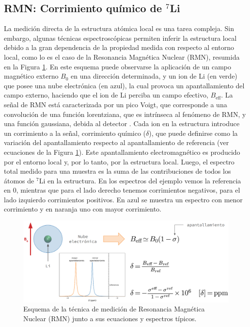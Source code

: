 \subsection{RMN: Corrimiento químico de $^7$Li}

La medición directa de la estructura atómica local es una tarea compleja. Sin
embargo, algunas técnicas espectroscópicas permiten inferir la estructura local 
debido a la gran dependencia de la propiedad medida con respecto al entorno local, 
como lo es el caso de la Resonancia Magnética Nuclear (RMN), resumida en la Figura \ref{fig:esquema-nmr}.
En este esquema puede observarse la aplicación de un campo magnético externo $B_0$ en una dirección determinada, y un ion de Li (en verde) que posee una nube electrónica (en azul), la cual provoca un apantallamiento del campo externo, haciendo que el ion de Li perciba un campo efectivo, $B_{\text{eff}}$.
La señal de RMN está caracterizada por un pico 
Voigt, que corresponde a una convolución de una función lorentziana, que 
es intrínseca al fenómeno de RMN, y una función gaussiana, debida al detector
\cite{higinbotham2001}. 
Cada ion en la estructura introduce un corrimiento a la señal, corrimiento químico ($\delta$), que puede definirse como la variación del apantallamiento respecto al apantallamiento de referencia (ver ecuaciones de la Figura \ref{fig:esquema-nmr}). 
Este apantallamiento electromagnético es producido por el entorno local y, por lo tanto, por la estructura local.
Luego, el espectro total medido para una muestra es la suma de las contribuciones de todos los átomos de $^7$Li en la estructura.
En los espectros del ejemplo vemos la referencia en 0, mientras que para el lado derecho tenemos corrimientos negativos, para el lado izquierdo corrimientos positivos. En azul se muestra un espectro con menor corrimiento y en naranja uno con mayor corrimiento.
\begin{figure}[h!]
    \centering
    \includegraphics[width=\textwidth]{Silicio/prediccion/resultados/nmr/esquema_nmr.png}
    \caption{Esquema de la técnica de medición de Resonancia Magnética Nuclear (RMN) junto a sus ecuaciones y espectros típicos.}
    \label{fig:esquema-nmr}
\end{figure}

